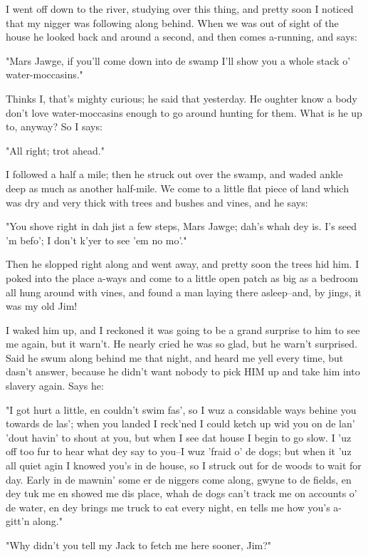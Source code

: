 I went off down to the river, studying over this thing, and pretty soon I
noticed that my nigger was following along behind.  When we was out of
sight of the house he looked back and around a second, and then comes
a-running, and says:

"Mars Jawge, if you'll come down into de swamp I'll show you a whole
stack o' water-moccasins."

Thinks I, that's mighty curious; he said that yesterday.  He oughter know
a body don't love water-moccasins enough to go around hunting for them.
What is he up to, anyway?  So I says:

"All right; trot ahead."

I followed a half a mile; then he struck out over the swamp, and waded
ankle deep as much as another half-mile.  We come to a little flat piece
of land which was dry and very thick with trees and bushes and vines, and
he says:

"You shove right in dah jist a few steps, Mars Jawge; dah's whah dey is.
I's seed 'm befo'; I don't k'yer to see 'em no mo'."

Then he slopped right along and went away, and pretty soon the trees hid
him.  I poked into the place a-ways and come to a little open patch as
big as a bedroom all hung around with vines, and found a man laying there
asleep--and, by jings, it was my old Jim!

I waked him up, and I reckoned it was going to be a grand surprise to him
to see me again, but it warn't.  He nearly cried he was so glad, but he
warn't surprised.  Said he swum along behind me that night, and heard me
yell every time, but dasn't answer, because he didn't want nobody to pick
HIM up and take him into slavery again.  Says he:

"I got hurt a little, en couldn't swim fas', so I wuz a considable ways
behine you towards de las'; when you landed I reck'ned I could ketch up
wid you on de lan' 'dout havin' to shout at you, but when I see dat house
I begin to go slow.  I 'uz off too fur to hear what dey say to you--I wuz
'fraid o' de dogs; but when it 'uz all quiet agin I knowed you's in de
house, so I struck out for de woods to wait for day.  Early in de mawnin'
some er de niggers come along, gwyne to de fields, en dey tuk me en
showed me dis place, whah de dogs can't track me on accounts o' de water,
en dey brings me truck to eat every night, en tells me how you's a-gitt'n
along."

"Why didn't you tell my Jack to fetch me here sooner, Jim?"

